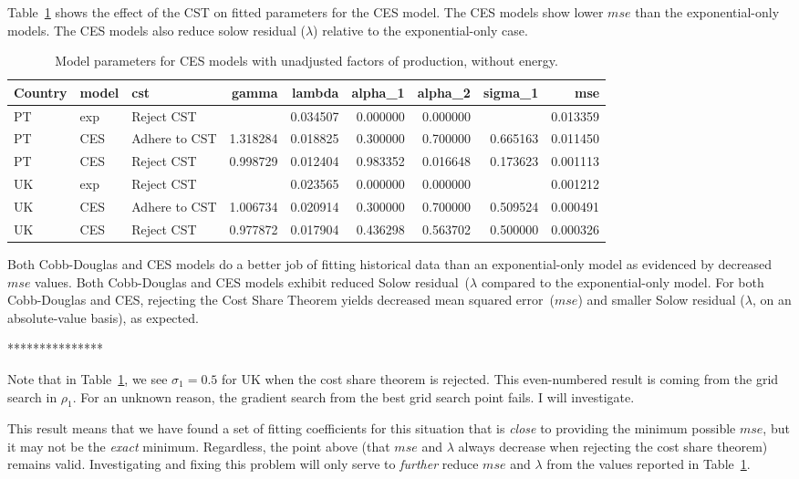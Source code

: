 \documentclass[preprint,authoryear,12pt]{elsarticle}\usepackage[]{graphicx}\usepackage[]{color}
\begin{document}
%
Table~\ref{tab:Effect_of_CST_CES} shows the effect of the CST 
on fitted parameters for the CES model.
The CES models show lower $mse$ than the exponential-only models.
The CES models also reduce solow residual ($\lambda$) relative
to the exponential-only case.
%
\begin{table}[ht]
\centering
\caption{Model parameters for CES models with unadjusted factors of production, without energy.} 
\label{tab:Effect_of_CST_CES}
{\tiny
\begin{tabular}{lllrrrrrr}
  \hline
Country & model & cst & gamma & lambda & alpha\_1 & alpha\_2 & sigma\_1 & mse \\ 
  \hline
PT & exp & Reject CST &  & 0.034507 & 0.000000 & 0.000000 &  & 0.013359 \\ 
  PT & CES & Adhere to CST & 1.318284 & 0.018825 & 0.300000 & 0.700000 & 0.665163 & 0.011450 \\ 
  PT & CES & Reject CST & 0.998729 & 0.012404 & 0.983352 & 0.016648 & 0.173623 & 0.001113 \\ 
  UK & exp & Reject CST &  & 0.023565 & 0.000000 & 0.000000 &  & 0.001212 \\ 
  UK & CES & Adhere to CST & 1.006734 & 0.020914 & 0.300000 & 0.700000 & 0.509524 & 0.000491 \\ 
  UK & CES & Reject CST & 0.977872 & 0.017904 & 0.436298 & 0.563702 & 0.500000 & 0.000326 \\ 
   \hline
\end{tabular}
}
\end{table}

%
Both Cobb-Douglas and CES models do a better job of fitting 
historical data than an exponential-only model
as evidenced by decreased $mse$ values.
Both Cobb-Douglas and CES models exhibit reduced Solow residual~($\lambda$
compared to the exponential-only model.
For both Cobb-Douglas and CES, rejecting the Cost Share Theorem yields
decreased mean squared error~($mse$) and
smaller Solow residual ($\lambda$, on an absolute-value basis),
as expected.

***************

Note that in Table~\ref{tab:Effect_of_CST_CES}, we see $\sigma_1 = 0.5$ 
for UK when the cost share theorem is rejected. 
This even-numbered result is coming from the grid search in $\rho_1$. 
For an unknown reason, the gradient search from the best grid search point
fails.
I will investigate.

This result means that we have found a set of fitting coefficients
for this situation 
that is \emph{close} to providing the minimum possible $mse$,
but it may not be the \emph{exact} minimum.
Regardless, the point above (that $mse$ and $\lambda$ always decrease 
when rejecting the cost share theorem) remains valid.
Investigating and fixing this problem
will only serve to \emph{further} reduce $mse$ and $\lambda$ 
from the values reported in Table~\ref{tab:Effect_of_CST_CES}.
\end{document}
